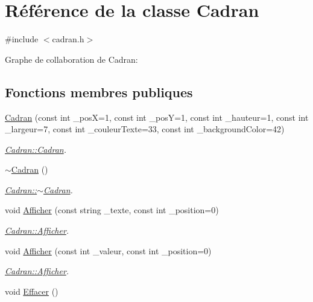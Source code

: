 \hypertarget{class_cadran}{}\section{Référence de la classe Cadran}
\label{class_cadran}


{\ttfamily \#include $<$cadran.\+h$>$}



Graphe de collaboration de Cadran\+:
\subsection*{Fonctions membres publiques}
\begin{DoxyCompactItemize}
\item 
\hyperlink{class_cadran_aa1fe9834aea81d49972cd88fef6f509f}{Cadran} (const int \+\_\+posX=1, const int \+\_\+posY=1, const int \+\_\+hauteur=1, const int \+\_\+largeur=7, const int \+\_\+couleur\+Texte=33, const int \+\_\+background\+Color=42)
\begin{DoxyCompactList}\small\item\em \hyperlink{class_cadran_aa1fe9834aea81d49972cd88fef6f509f}{Cadran\+::\+Cadran}. \end{DoxyCompactList}\item 
\hyperlink{class_cadran_ae710cda2ec2d5b84d33599a9dc37893b}{$\sim$\+Cadran} ()
\begin{DoxyCompactList}\small\item\em \hyperlink{class_cadran_ae710cda2ec2d5b84d33599a9dc37893b}{Cadran\+::$\sim$\+Cadran}. \end{DoxyCompactList}\item 
void \hyperlink{class_cadran_a3cbd2586cd8c0a0b52f4a0558f1a32a1}{Afficher} (const string \+\_\+texte, const int \+\_\+position=0)
\begin{DoxyCompactList}\small\item\em \hyperlink{class_cadran_a3cbd2586cd8c0a0b52f4a0558f1a32a1}{Cadran\+::\+Afficher}. \end{DoxyCompactList}\item 
void \hyperlink{class_cadran_a3e85b675d09c46cca13aae23acc4c6e0}{Afficher} (const int \+\_\+valeur, const int \+\_\+position=0)
\begin{DoxyCompactList}\small\item\em \hyperlink{class_cadran_a3cbd2586cd8c0a0b52f4a0558f1a32a1}{Cadran\+::\+Afficher}. \end{DoxyCompactList}\item 
void \hyperlink{class_cadran_ae0241c088e1b351fb8bcbd2c6436cac9}{Effacer} ()
\end{DoxyCompactItemize}
